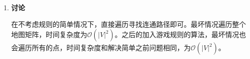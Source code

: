 \documentclass[12pt,a4paper]{article}
\theoremstyle{definition}
\begin{document}
\begin{enumerate}
{	} 
	
	\item{
		\textbf{讨论}
		
		在不考虑规则的简单情况下，直接遍历寻找连通路径即可。最坏情况遍历整个地图矩阵，时间复杂度为$\mathcal{O}(|V|^2)$。之后的加入游戏规则的算法，最坏情况也会遍历所有的点，时间复杂度和解决简单之前问题相同，为$\mathcal{O}(|V|^2)$。
	}
\end{enumerate}
\end{document}
